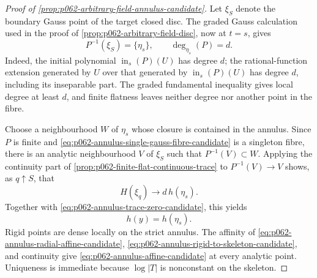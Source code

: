 \begin{proof}[Proof of \cref{prop:p062-arbitrary-field-annulus-candidate}]
Let \(\xi_S\) denote the boundary Gauss point of the target closed disc.
The graded Gauss calculation used in the proof of
\cref{prop:p062-arbitrary-field-disc}, now at \(t=s\), gives
\begin{equation}\label{eq:p062-annulus-single-gauss-fibre-candidate}
                      P^{-1}(\xi_S)=\{\eta_s\},
                      \qquad \deg_{\eta_s}(P)=d.
\end{equation}
Indeed, the initial polynomial
\(\operatorname{in}_s(P)(U)\) has degree \(d\); the rational-function
extension generated by \(U\) over that generated by
\(\operatorname{in}_s(P)(U)\) has degree \(d\), including its inseparable
part. The graded fundamental inequality gives local degree at least \(d\),
and finite flatness leaves neither degree nor another point in the fibre.

Choose a neighbourhood \(W\) of \(\eta_s\) whose closure is contained in
the annulus. Since \(P\) is finite and
\eqref{eq:p062-annulus-single-gauss-fibre-candidate} is a singleton fibre,
there is an analytic neighbourhood \(V\) of \(\xi_S\) such that
\(P^{-1}(V)\subset W\). Applying the continuity part of
\cref{prop:p062-finite-flat-continuous-trace} to
\(P^{-1}(V)\to V\) shows, as \(q\uparrow S\), that
\[
             H(\xi_q)\longrightarrow d\,h(\eta_s).
\]
Together with \eqref{eq:p062-annulus-trace-zero-candidate}, this yields
\begin{equation}\label{eq:p062-annulus-rigid-to-skeleton-candidate}
                              h(y)=h(\eta_s).
\end{equation}
Rigid points are dense locally on the strict annulus. The affinity of
\eqref{eq:p062-annulus-radial-affine-candidate},
\eqref{eq:p062-annulus-rigid-to-skeleton-candidate}, and continuity give
\eqref{eq:p062-annulus-affine-candidate} at every analytic point.
Uniqueness is immediate because \(\log|T|\) is nonconstant on the
skeleton.
\end{proof}

